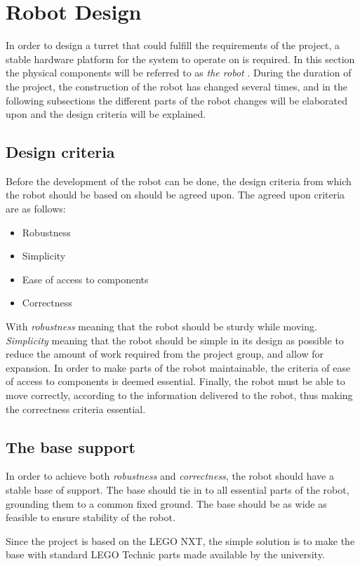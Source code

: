 \section{Robot Design}\label{Design:Robot}
In order to design a turret that could fulfill the requirements of the project, a stable hardware platform for the system to operate on is required. 
In this section the physical components will be referred to as \textit{the robot} .
During the duration of the project, the construction of the robot has changed several times, and in the following subsections the different parts of the robot changes will be elaborated upon and the design criteria will be explained. 

\subsection{Design criteria}
Before the development of the robot can be done, the design criteria from which the robot should be based on should be agreed upon. 
The agreed upon criteria are as follows:
\begin{itemize}
    \item Robustness
    \item Simplicity
    \item Ease of access to components
    \item Correctness
\end{itemize}

With \textit{robustness} meaning that the robot should be sturdy while moving.
\textit{Simplicity} meaning that the robot should be simple in its design as possible to reduce the amount of work required from the project group, and allow for expansion. 
In order to make parts of the robot maintainable, the criteria of ease of access to components is deemed essential. 
Finally, the robot must be able to move correctly, according to the information delivered to the robot, thus making the correctness criteria essential. 

\subsection{The base support}
In order to achieve both \textit{robustness} and \textit{correctness}, the robot should have a stable base of support. 
The base should tie in to all essential parts of the robot, grounding them to a common fixed ground.
The base should be as wide as feasible to ensure stability of the robot. 

Since the project is based on the LEGO NXT, the simple solution is to make the base with standard LEGO Technic parts made available by the university. 

